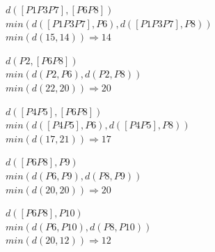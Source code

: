 \documentclass{article}
\begin{document}
  \begin{center}
    $d([P1 P3 P7],[P6 P8])$ \\
    $min(d([P1 P3 P7],P6), d([P1 P3 P7], P8))$ \\
    $min(d(15, 14)) \Rightarrow 14$ \\
  \end{center}
  \begin{center}
    $d(P2,[P6 P8])$ \\
    $min(d(P2,P6), d(P2, P8))$ \\
    $min(d(22, 20)) \Rightarrow 20$ \\
  \end{center}
  \begin{center}
    $d([P4 P5],[P6 P8])$ \\
    $min(d([P4 P5],P6), d([P4 P5], P8))$ \\
    $min(d(17, 21)) \Rightarrow 17$ \\
  \end{center}
  \begin{center}
    $d([P6 P8], P9)$ \\
    $min(d(P6 ,P9), d(P8, P9))$ \\
    $min(d(20, 20)) \Rightarrow 20$ \\
  \end{center}
  \begin{center}
    $d([P6 P8], P10)$ \\
    $min(d(P6 ,P10), d(P8, P10))$ \\
    $min(d(20, 12)) \Rightarrow 12$ \\
  \end{center}
  
\end{document}
